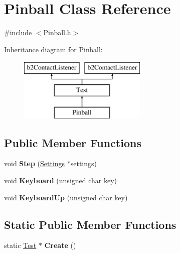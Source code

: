 \hypertarget{class_pinball}{\section{Pinball Class Reference}
\label{class_pinball}
}


{\ttfamily \#include $<$Pinball.\-h$>$}

Inheritance diagram for Pinball\-:\begin{figure}[H]
\begin{center}
\leavevmode
\includegraphics[height=3.000000cm]{class_pinball}
\end{center}
\end{figure}
\subsection*{Public Member Functions}
\begin{DoxyCompactItemize}
\item 
\hypertarget{class_pinball_a4f6164dcb0a97bd74bed84df0aee9f5e}{void {\bfseries Step} (\hyperlink{struct_settings}{Settings} $\ast$settings)}\label{class_pinball_a4f6164dcb0a97bd74bed84df0aee9f5e}

\item 
\hypertarget{class_pinball_a902c4b17ecb5463e6d93b092fdb9bb05}{void {\bfseries Keyboard} (unsigned char key)}\label{class_pinball_a902c4b17ecb5463e6d93b092fdb9bb05}

\item 
\hypertarget{class_pinball_a23067797ff9192371eba5dadc50f2e88}{void {\bfseries Keyboard\-Up} (unsigned char key)}\label{class_pinball_a23067797ff9192371eba5dadc50f2e88}

\end{DoxyCompactItemize}
\subsection*{Static Public Member Functions}
\begin{DoxyCompactItemize}
\item 
\hypertarget{class_pinball_ae9230c906aeae3d298a160790849daa3}{static \hyperlink{class_test}{Test} $\ast$ {\bfseries Create} ()}\label{class_pinball_ae9230c906aeae3d298a160790849daa3}

\end{DoxyCompactItemize}
